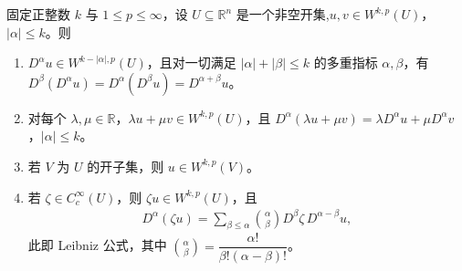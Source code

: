 \documentclass[../../main.tex]{subfiles}
\begin{document}
\begin{theorem}[弱导数的性质]\label{theorem:ch05-弱导数性质}
固定正整数 $k$ 与 $1\leqslant p\leqslant \infty$，设 $U \subseteq \mathbb{R}^n$ 是一个非空开集,$u,v\in W^{k,p}(U)$，$|\alpha|\leqslant k$。则
\begin{enumerate}[(1)]
\item\label{theorem:ch05-弱导数性质-1} $D^{\alpha}u\in W^{k-|\alpha|,p}(U)$，且对一切满足 $|\alpha|+|\beta|\leqslant k$ 的多重指标 $\alpha,\beta$，有 $D^{\beta}(D^{\alpha}u)=D^{\alpha}(D^{\beta}u)=D^{\alpha+\beta}u$。

\item\label{theorem:ch05-弱导数性质-2} 对每个 $\lambda,\mu\in\mathbb{R}$，$\lambda u+\mu v\in W^{k,p}(U)$，且 $D^{\alpha}(\lambda u+\mu v)=\lambda D^{\alpha}u+\mu D^{\alpha}v$，$|\alpha|\leqslant k$。

\item\label{theorem:ch05-弱导数性质-3} 若 $V$ 为 $U$ 的开子集，则 $u\in W^{k,p}(V)$。

\item\label{theorem:ch05-弱导数性质-4} 若 $\zeta\in C^{\infty}_{c}(U)$，则 $\zeta u\in W^{k,p}(U)$，且
\begin{align}
D^{\alpha}(\zeta u)=\sum_{\beta\leqslant\alpha}\binom{\alpha}{\beta}D^{\beta}\zeta\,D^{\alpha-\beta}u,
\label{align:ch05-leibniz}
\end{align}
此即 Leibniz 公式，其中 $\binom{\alpha}{\beta}=\dfrac{\alpha!}{\beta!(\alpha-\beta)!}$。
\end{enumerate}
\end{theorem}
\end{document}
